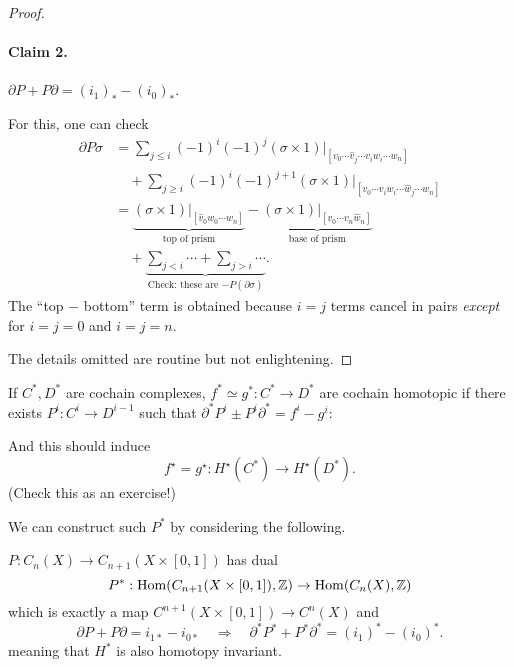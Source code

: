 \documentclass[a4paper,11pt]{article}
\begin{document}
\begin{proof}
		\paragraph{Claim 2.} $\partial P + P \partial = (i_1)_* - (i_0)_*$.

		For this, one can check
		\begin{align*}
			\partial P \sigma & = \sum _{j \leq i} (-1)^i (-1)^j (\sigma \times 1)\big|_{[v_0 \cdots \hat{v}_j \cdots v_i w_i \cdots w_n]}\\
			& \quad + \sum _{j \geq i} (-1)^i (-1)^{j+1} (\sigma \times 1)\big|_{[v_0 \cdots v_i w_i \cdots \hat{w}_j \cdots w_n]}\\
			& = \underbrace{(\sigma \times 1)\big|_{[\hat{v}_0 w_0 \cdots w_n]}}_{\text{top of prism}} - \underbrace{(\sigma \times 1)\big|_{[v_0 \cdots v_n \hat{w}_n]}}_{\text{base of prism}}\\
			& \quad +\underbrace{\sum _{j<i}\cdots + \sum _{j>i}\cdots}_{\text{Check: these are $-P(\partial \sigma)$}}.
		\end{align*}
		The ``top $-$ bottom'' term is obtained because $i = j$ terms cancel in pairs \emph{except} for $i=j=0$ and $i=j=n$.

		The details omitted are routine but not enlightening.
	\end{proof}

	\begin{rmk}
		If $C^*, D^*$ are cochain complexes, $f^* \simeq g^*: C^* \to D^*$ are cochain homotopic if there exists $P^i : C^i \to D ^{i-1}$ such that $\partial^* P^i \pm P^i \partial^* = f^i - g^i$:
		\begin{center}
		\end{center}
		
		And this should induce 
		\[
			f^\star = g^\star : H^\star(C^*) \to H^\star (D^*).
		\]
		(Check this as an exercise!)

		We can construct such $P^*$ by considering the following.

		$P: C_n(X) \to C _{n+1}(X\times [0,1])$ has dual
		\[
			P^* : \operatorname{Hom}(C _{n+1}(X\times [0,1]), \mathbb{Z}) \to \operatorname{Hom}(C_n(X),\mathbb{Z})
		\]
		which is exactly a map $C ^{n+1}(X\times [0,1])\to C^n(X)$ and 
		\[
			\partial P + P \partial = i _{1*} - i _{0*} \quad \Rightarrow \quad \partial^* P^* + P^* \partial^* = (i_1)^* - (i_0)^*.
		\]
		meaning that $H^*$ is also homotopy invariant.
	\end{rmk}
\end{document}
